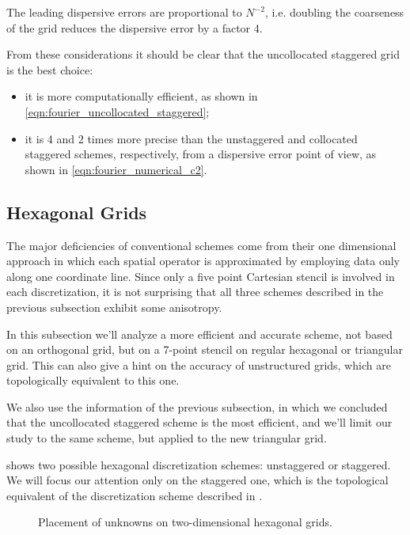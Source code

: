 The leading dispersive errors are proportional to $N^{-2}$,
i.e. doubling the coarseness of the grid reduces the dispersive error
by a factor 4.

From these considerations it should be clear that the uncollocated
staggered grid is the best choice:
\begin{itemize}
\item
  it is more computationally efficient, as shown in \eqref{eqn:fourier_uncollocated_staggered};
\item
  it is 4 and 2 times more precise than the unstaggered and collocated
  staggered schemes, respectively, from a dispersive error point of
  view, as shown in \eqref{eqn:fourier_numerical_c2}.
\end{itemize}


\subsection{Hexagonal Grids} 

The major deficiencies of conventional schemes come from their one
dimensional approach in which each spatial operator is approximated by
employing data only along one coordinate line. Since only a five point
Cartesian stencil is involved in each discretization, it is not
surprising that all three schemes described in the previous subsection
exhibit some anisotropy.

In this subsection we'll analyze a more efficient and accurate scheme,
not based on an orthogonal grid, but on a 7-point stencil on regular
hexagonal or triangular grid. This can also give a hint on the accuracy
of unstructured grids, which are topologically equivalent to this one.

We also use the information of the previous subsection, in which we
concluded that the uncollocated staggered scheme is the most efficient,
and we'll limit our study to the same scheme, but applied to the new
triangular grid.

 shows two possible hexagonal discretization schemes:
unstaggered or staggered. We will focus our attention only on the
staggered one, which is the topological equivalent of the
discretization scheme described in .

\begin{figure}[htbp]
  \begin{center}
    \subfigure[Unstaggered.]{\resizebox{3.5cm}{!}{}}
    \subfigure[Staggered.]{\label{fig:liu_fig4b}\resizebox{3.5cm}{!}{}}
  \end{center}
  \caption{Placement of unknowns on two-dimensional hexagonal grids.}
  \label{fig:liu_fig4}
\end{figure}

